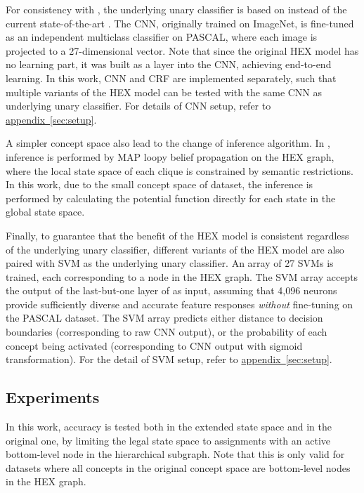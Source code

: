 \documentclass[11pt,a4paper]{article}
\begin{document}
For consistency with \cite{deng2014large}, the underlying unary classifier is based on \cite{krizhevsky2012imagenet} instead of the current state-of-the-art \cite{simonyan2014very}. The CNN, originally trained on ImageNet, is fine-tuned as an independent multiclass classifier on PASCAL, where each image is projected to a 27-dimensional vector. Note that since the original HEX model has no learning part, it was built as a layer into the CNN, achieving end-to-end learning. In this work, CNN and CRF are implemented separately, such that multiple variants of the HEX model can be tested with the same CNN as underlying unary classifier. For details of CNN setup, refer to \hyperref[sec:setup]{appendix~\ref{sec:setup}}.

A simpler concept space also lead to the change of inference algorithm. In \cite{deng2014large}, inference is performed by MAP loopy belief propagation on the HEX graph, where the local state space of each clique is constrained by semantic restrictions. In this work, due to the small concept space of dataset, the inference is performed by calculating the potential function directly for each state in the global state space.

Finally, to guarantee that the benefit of the HEX model is consistent regardless of the underlying unary classifier, different variants of the HEX model are also paired with SVM as the underlying unary classifier. An array of 27 SVMs is trained, each corresponding to a node in the HEX graph. The SVM array accepts the output of the last-but-one layer of \cite{krizhevsky2012imagenet} as input, assuming that 4,096 neurons provide sufficiently diverse and accurate feature responses \emph{without} fine-tuning on the PASCAL dataset. The SVM array predicts either distance to decision boundaries (corresponding to raw CNN output), or the probability of each concept being activated (corresponding to CNN output with sigmoid transformation). For the detail of SVM setup, refer to \hyperref[sec:setup]{appendix~\ref{sec:setup}}.

\subsection{Experiments}
\label{sec:exp1}

In this work, accuracy is tested both in the extended state space and in the original one, by limiting the legal state space to assignments with an active bottom-level node in the hierarchical subgraph. Note that this is only valid for datasets where all concepts in the original concept space are bottom-level nodes in the HEX graph.
\end{document}
